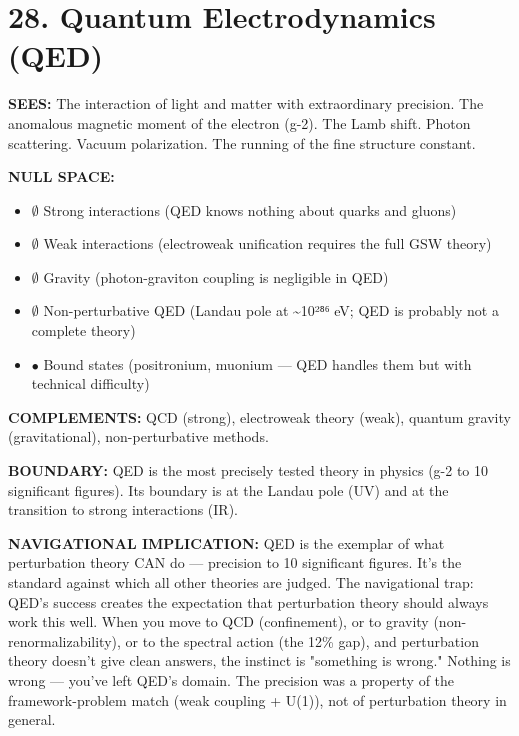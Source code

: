 \bigskip\noindent\makebox[\textwidth]{\color{rulegray}\rule{5cm}{0.3pt}}\bigskip


\section*{28. Quantum Electrodynamics (QED)}


\textbf{SEES:} The interaction of light and matter with extraordinary precision. The anomalous magnetic moment of the electron (g-2). The Lamb shift. Photon scattering. Vacuum polarization. The running of the fine structure constant.


\textbf{NULL SPACE:}

\begin{itemize}[nosep,leftmargin=*]
  \item $\emptyset$ Strong interactions (QED knows nothing about quarks and gluons)
  \item $\emptyset$ Weak interactions (electroweak unification requires the full GSW theory)
  \item $\emptyset$ Gravity (photon-graviton coupling is negligible in QED)
  \item $\emptyset$ Non-perturbative QED (Landau pole at \textasciitilde{}10²⁸⁶ eV; QED is probably not a complete theory)
  \item $\bullet$ Bound states (positronium, muonium — QED handles them but with technical difficulty)
\end{itemize}


\textbf{COMPLEMENTS:} QCD (strong), electroweak theory (weak), quantum gravity (gravitational), non-perturbative methods.


\textbf{BOUNDARY:} QED is the most precisely tested theory in physics (g-2 to 10 significant figures). Its boundary is at the Landau pole (UV) and at the transition to strong interactions (IR).


\textbf{NAVIGATIONAL IMPLICATION:} QED is the exemplar of what perturbation theory CAN do — precision to 10 significant figures. It's the standard against which all other theories are judged. The navigational trap: QED's success creates the expectation that perturbation theory should always work this well. When you move to QCD (confinement), or to gravity (non-renormalizability), or to the spectral action (the 12\% gap), and perturbation theory doesn't give clean answers, the instinct is "something is wrong." Nothing is wrong — you've left QED's domain. The precision was a property of the framework-problem match (weak coupling + U(1)), not of perturbation theory in general.


